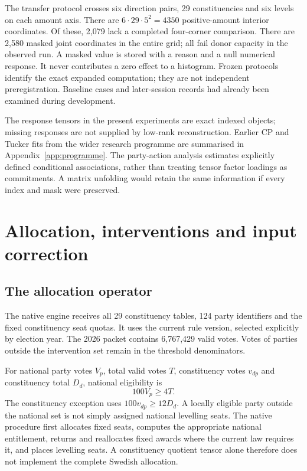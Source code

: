 The transfer protocol crosses six direction pairs, 29 constituencies and six levels on each amount axis. There are \(6\cdot29\cdot5^2=4350\) positive-amount interior coordinates. Of these, 2,079 lack a completed four-corner comparison. There are 2,580 masked joint coordinates in the entire grid; all fail donor capacity in the observed run. A masked value is stored with a reason and a null numerical response. It never contributes a zero effect to a histogram. Frozen protocols identify the exact expanded computation; they are not independent preregistration. Baseline cases and later-session records had already been examined during development.

The response tensors in the present experiments are exact indexed objects; missing responses are not supplied by low-rank reconstruction. Earlier CP and Tucker fits from the wider research programme are summarised in Appendix~\ref{app:programme}. The party-action analysis estimates explicitly defined conditional associations, rather than treating tensor factor loadings as commitments. A matrix unfolding would retain the same information if every index and mask were preserved.

\section{Allocation, interventions and input correction}\label{app:allocation}

\subsection{The allocation operator}

The native engine receives all 29 constituency tables, 124 party identifiers and the fixed constituency seat quotas. It uses the current rule version, selected explicitly by election year. The 2026 packet contains 6,767,429 valid votes. Votes of parties outside the intervention set remain in the threshold denominators.

For national party votes \(V_p\), total valid votes \(T\), constituency votes \(v_{dp}\) and constituency total \(D_d\), national eligibility is
\[
100V_p\ge4T.
\]
The constituency exception uses \(100v_{dp}\ge12D_d\). A locally eligible party outside the national set is not simply assigned national levelling seats. The native procedure first allocates fixed seats, computes the appropriate national entitlement, returns and reallocates fixed awards where the current law requires it, and places levelling seats. A constituency quotient tensor alone therefore does not implement the complete Swedish allocation.

